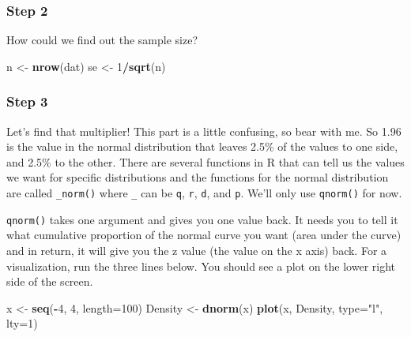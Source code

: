 \documentclass[
]{article}
\newenvironment{Shaded}{\begin{snugshade}}{\end{snugshade}}
\newcommand{\AttributeTok}[1]{\textcolor[rgb]{0.13,0.29,0.53}{#1}}
\newcommand{\DecValTok}[1]{\textcolor[rgb]{0.00,0.00,0.81}{#1}}
\newcommand{\FunctionTok}[1]{\textcolor[rgb]{0.13,0.29,0.53}{\textbf{#1}}}
\newcommand{\NormalTok}[1]{#1}
\newcommand{\OtherTok}[1]{\textcolor[rgb]{0.56,0.35,0.01}{#1}}
\newcommand{\SpecialCharTok}[1]{\textcolor[rgb]{0.81,0.36,0.00}{\textbf{#1}}}
\newcommand{\StringTok}[1]{\textcolor[rgb]{0.31,0.60,0.02}{#1}}
\begin{document}
\hypertarget{step-2}{%
\subsubsection{Step 2}\label{step-2}}

How could we find out the sample size?

\begin{Shaded}
\begin{Highlighting}[]
\NormalTok{n }\OtherTok{\textless{}{-}} \FunctionTok{nrow}\NormalTok{(dat)}
\NormalTok{se }\OtherTok{\textless{}{-}} \DecValTok{1}\SpecialCharTok{/}\FunctionTok{sqrt}\NormalTok{(n)}
\end{Highlighting}
\end{Shaded}

\hypertarget{step-3}{%
\subsubsection{Step 3}\label{step-3}}

Let's find that multiplier! This part is a little confusing, so bear
with me. So 1.96 is the value in the normal distribution that leaves
2.5\% of the values to one side, and 2.5\% to the other. There are
several functions in R that can tell us the values we want for specific
distributions and the functions for the normal distribution are called
\texttt{\_norm()} where \texttt{\_} can be \texttt{q}, \texttt{r},
\texttt{d}, and \texttt{p}. We'll only use \texttt{qnorm()} for now.

\texttt{qnorm()} takes one argument and gives you one value back. It
needs you to tell it what cumulative proportion of the normal curve you
want (area under the curve) and in return, it will give you the z value
(the value on the x axis) back. For a visualization, run the three lines
below. You should see a plot on the lower right side of the screen.

\begin{Shaded}
\begin{Highlighting}[]
\NormalTok{x }\OtherTok{\textless{}{-}} \FunctionTok{seq}\NormalTok{(}\SpecialCharTok{{-}}\DecValTok{4}\NormalTok{, }\DecValTok{4}\NormalTok{, }\AttributeTok{length=}\DecValTok{100}\NormalTok{)}
\NormalTok{Density }\OtherTok{\textless{}{-}} \FunctionTok{dnorm}\NormalTok{(x)}
\FunctionTok{plot}\NormalTok{(x, Density,  }\AttributeTok{type=}\StringTok{"l"}\NormalTok{, }\AttributeTok{lty=}\DecValTok{1}\NormalTok{)}
\end{Highlighting}
\end{Shaded}
\end{document}
